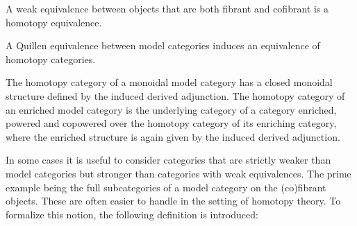     \begin{theorem}[Whitehead]
        A weak equivalence between objects that are both fibrant and cofibrant is a homotopy equivalence.
    \end{theorem}

    \begin{property}
        A Quillen equivalence between model categories induces an equivalence of homotopy categories.
    \end{property}

    \begin{property}
        The homotopy category of a monoidal model category has a closed monoidal structure defined by the induced derived adjunction. The homotopy category of an enriched model category is the underlying category of a category enriched, powered and copowered over the homotopy category of its enriching category, where the enriched structure is again given by the induced derived adjunction.
    \end{property}

    In some cases it is useful to consider categories that are strictly weaker than model categories but stronger than categories with weak equivalences. The prime example being the full subcategories of a model category on the (co)fibrant objects. These are often easier to handle in the setting of homotopy theory. To formalize this notion, the following definition is introduced:

